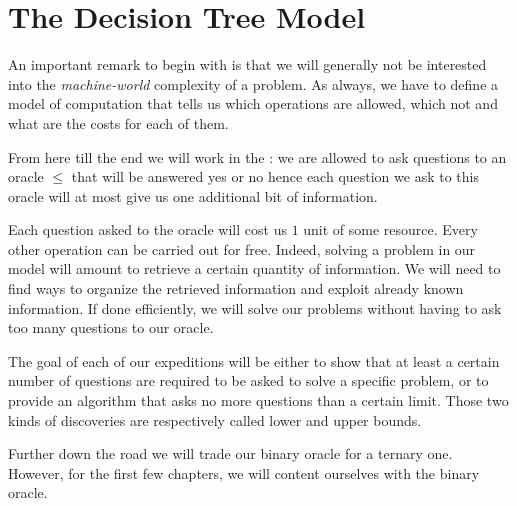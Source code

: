 \section{The Decision Tree Model}
\label{tree:sorting:model}

An important remark to begin with is that we will generally not be interested
into the \emph{machine-world} complexity of a problem. As always, we have to
define a model of computation that tells us which operations are allowed, which
not and what are the costs for each of them.

From here till the end we will work in the :
we are allowed to ask questions to an oracle \(\le\) that will be answered yes or
no hence each question we ask to this oracle will at most give us one
additional bit of information.

Each question asked to the oracle will cost us $1$ unit of some resource.
Every other operation can be carried out for free. Indeed, solving a problem in
our model will amount to retrieve a certain quantity of information. We will
need to find ways to organize the retrieved information and exploit already
known information. If done efficiently, we will solve our problems without
having to ask too many questions to our oracle.

The goal of each of our expeditions will be either to show that at least a
certain number of questions are required to be asked to solve a specific
problem, or to provide an algorithm that asks no more questions than a certain
limit. Those two kinds of discoveries are respectively called lower and upper
bounds.

Further down the road we will trade our binary oracle for a ternary one.
However, for the first few chapters, we will content ourselves with the binary
oracle.
